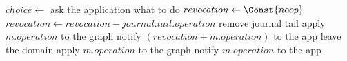 \documentclass[preview]{standalone}
\begin{document}
  \begin{algorithmic}
        \State $choice\gets$ ask the application what to do
          \State $revocation\gets \Const{noop}$
          \Repeat
            \State $revocation\gets revocation - journal.tail.operation$
            \State remove journal tail
          \State apply $m.operation$ to the graph
          \State notify $(revocation + m.operation)$ to the app
          \State leave the domain
        \EndIf
      \Else
        \State apply $m.operation$ to the graph
        \State notify $m.operation$ to the app
      \EndIf
    \EndProcedure
  \end{algorithmic}
\end{document}
